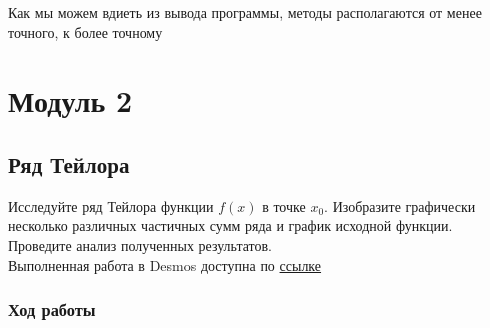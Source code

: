 \documentclass{article}
\begin{document}
Как мы можем вдиеть из вывода программы, методы располагаются от менее точного, к более точному

\section{Модуль 2}

\subsection{Ряд Тейлора}
Исследуйте ряд Тейлора функции $f(x)$ в точке $x_0$. Изобразите графически несколько различных  частичных сумм ряда и график исходной функции. Проведите анализ полученных результатов.\\

Выполненная работа в Desmos доступна по 
\href{https://www.desmos.com/calculator/0sct6ckztm}{ссылке}

\subsubsection*{Ход работы}
\end{document}
